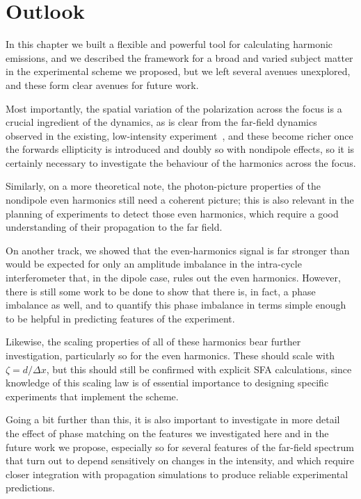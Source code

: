 \section{Outlook}
In this chapter we built a flexible and powerful tool for calculating harmonic emissions, and we described the framework for a broad and varied subject matter in the experimental scheme we proposed, but we left several avenues unexplored, and these form clear avenues for future work.

Most importantly, the spatial variation of the polarization across the focus is a crucial ingredient of the dynamics, as is clear from the far-field dynamics observed in the existing, low-intensity experiment~\cite{hickstein_non-collinear_2015}, and these become richer once the forwards ellipticity is introduced and doubly so with nondipole effects, so it is certainly necessary to investigate the behaviour of the harmonics across the focus.

Similarly, on a more theoretical note, the photon-picture properties of the nondipole even harmonics still need a coherent picture; this is also relevant in the planning of experiments to detect those even harmonics, which require a good understanding of their propagation to the far field.

On another track, we showed that the even-harmonics signal is far stronger than would be expected for only an amplitude imbalance in the intra-cycle interferometer that, in the dipole case, rules out the even harmonics. However, there is still some work to be done to show that there is, in fact, a phase imbalance as well, and to quantify this phase imbalance in terms simple enough to be helpful in predicting features of the experiment. 

Likewise, the scaling properties of all of these harmonics bear further investigation, particularly so for the even harmonics. These should scale with $\zeta = d/\Delta x$, but this should still be confirmed with explicit SFA calculations, since knowledge of this scaling law is of essential importance to designing specific experiments that implement the scheme.

Going a bit further than this, it is also important to investigate in more detail the effect of phase matching on the features we investigated here and in the future work we propose, especially so for several features of the far-field spectrum that turn out to depend sensitively on changes in the intensity, and which require closer integration with propagation simulations to produce reliable experimental predictions.

